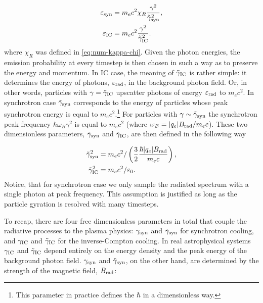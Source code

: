 \begin{equation}
    \begin{aligned}
        \varepsilon_{\rm syn} &= m_e c^2 \chi_R\frac{\gamma^2}{\tilde{\gamma}_{\rm syn}^2},\\
        \varepsilon_{\rm IC} &= m_e c^2 \frac{\gamma^2}{\tilde{\gamma}_{\rm IC}^2}.
    \end{aligned}
\end{equation}
\noindent where $\chi_R$ was defined in \eqref{eq:num-kappa-chi}. Given the photon energies, the emission probability at every timestep is then chosen in such a way as to preserve the energy and momentum. In IC case, the meaning of $\tilde{\gamma}_{\rm IC}$ is rather simple: it determines the energy of photons, $\varepsilon_{\rm rad}$, in the background photon field. Or, in other words, particles with $\gamma=\tilde{\gamma}_{\rm IC}$ upscatter photons of energy $\varepsilon_{\rm rad}$ to $m_e c^2$. In synchrotron case $\tilde{\gamma}_{\rm syn}$ corresponds to the energy of particles whose peak synchrotron energy is equal to $m_e c^2$.\footnote{This parameter in practice defines the $\hbar$ in a dimensionless way.} For particles with $\gamma\sim \tilde{\gamma}_{\rm syn}$ the synchrotron peak frequency $\hbar \omega_B \gamma^2$ is equal to $m_e c^2$ (where $\omega_B = |q_e| B_{\rm rad} / m_e c$). These two dimensionless parameters, $\tilde{\gamma}_{\rm syn}$ and $\tilde{\gamma}_{\rm IC}$, are then defined in the following way

\begin{equation}
\begin{aligned}
    \tilde{\gamma}_{\rm syn}^2 &= m_e c^2 / \left(\frac{3}{2}\frac{\hbar |q_e| B_{\rm rad}}{m_e c}\right),\\
    \tilde{\gamma}_{\rm IC}^2 &= m_e c^2 / \varepsilon_0. 
\end{aligned}
\end{equation}
\noindent Notice, that for synchrotron case we only sample the radiated spectrum with a single photon at peak frequency. This assumption is justified as long as the particle gyration is resolved with many timesteps.

To recap, there are four free dimensionless parameters in total that couple the radiative processes to the plasma physics: $\gamma_{\rm syn}$ and $\tilde{\gamma}_{\rm syn}$ for synchrotron cooling, and $\gamma_{\rm IC}$ and $\tilde{\gamma}_{\rm IC}$ for the inverse-Compton cooling. In real astrophysical systems $\gamma_{\rm IC}$ and $\tilde{\gamma}_{\rm IC}$ depend entirely on the energy density and the peak energy of the background photon field. $\gamma_{\rm syn}$ and $\tilde{\gamma}_{\rm syn}$, on the other hand, are determined by the strength of the magnetic field, $B_{\rm rad}$:

